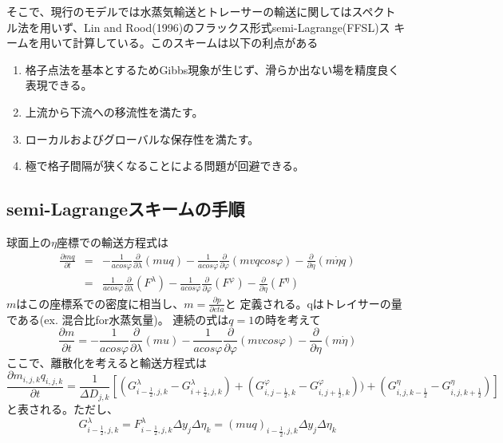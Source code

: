 \documentclass{jsbook}
\begin{document}
そこで、現行のモデルでは水蒸気輸送とトレーサーの輸送に関してはスペクト
ル法を用いず、Lin and Rood(1996)のフラックス形式semi-Lagrange(FFSL)ス
キームを用いて計算している。このスキームは以下の利点がある
\begin{enumerate}
\item 格子点法を基本とするためGibbs現象が生じず、滑らか出ない場を精度良く表現できる。
\item 上流から下流への移流性を満たす。
\item ローカルおよびグローバルな保存性を満たす。
\item 極で格子間隔が狭くなることによる問題が回避できる。
\end{enumerate}

\subsection{semi-Lagrangeスキームの手順}
球面上の$\eta$座標での輸送方程式は
\begin{eqnarray*}
  \frac{\partial mq}{\partial t} &=& - \frac{1}{a cos \varphi} \frac{\partial}{\partial \lambda}(muq)- \frac{1}{a cos \varphi} \frac{\partial}{\partial \varphi}(mvq cos \varphi)- \frac{\partial}{\partial \eta} (m \dot{\eta} q)\\
  &=& \frac{1}{a cos \varphi} \frac{\partial}{\partial \lambda}(F^{\lambda})- \frac{1}{a cos \varphi} \frac{\partial}{\partial \varphi}(F^{\varphi})- \frac{\partial}{\partial \eta} (F^{\eta})
\end{eqnarray*}
$m$はこの座標系での密度に相当し、$m=\frac{\partial p}{\partial eta}$と
定義される。qはトレイサーの量である(ex. 混合比for水蒸気量)。
連続の式は$q=1$の時を考えて
\begin{equation}
  \frac{\partial m}{\partial t} = - \frac{1}{a cos \varphi} \frac{\partial}{\partial \lambda}(mu)- \frac{1}{a cos \varphi} \frac{\partial}{\partial \varphi}(mv cos \varphi)- \frac{\partial}{\partial \eta} (m \dot{\eta})
\end{equation}
ここで、離散化を考えると輸送方程式は
\begin{equation}
  \frac{\partial m_{i,j,k} q_{i,j,k}}{\partial t}=\frac{1}{\Delta D_{j,k}}[(G^{\lambda}_{i-\frac{1}{2},j,k}-G^{\lambda}_{i+\frac{1}{2},j,k})+(G^{\varphi}_{i,j-\frac{1}{2},k}-G^{\varphi}_{i,j+\frac{1}{2},k}))+(G^{\eta}_{i,j,k-\frac{1}{2}}-G^{\eta}_{i,j,k+\frac{1}{2}})]
\end{equation}
と表される。ただし、
\begin{equation}
  G^{\lambda}_{i-\frac{1}{2},j,k}=F^{\lambda}_{i-\frac{1}{2},j,k} \Delta y_{j} \Delta \eta_{k}=(muq)_{i-\frac{1}{2},j,k} \Delta y_{j} \Delta \eta_{k}
\end{equation}
\end{document}
